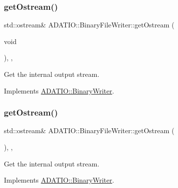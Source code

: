\subsubsection{\texorpdfstring{getOstream()}{getOstream()}\hspace{0.1cm}{\footnotesize\ttfamily [1/3]}}
{\footnotesize\ttfamily std\+::ostream\& A\+D\+A\+T\+I\+O\+::\+Binary\+File\+Writer\+::get\+Ostream (\begin{DoxyParamCaption}\item[{void}]{ }\end{DoxyParamCaption})\hspace{0.3cm}{\ttfamily [inline]}, {\ttfamily [protected]}, {\ttfamily [virtual]}}



Get the internal output stream. 



Implements \mbox{\hyperlink{classADATIO_1_1BinaryWriter_a4fe227341d17d012bb83a070c208dac0}{A\+D\+A\+T\+I\+O\+::\+Binary\+Writer}}.

\mbox{\label{classADATIO_1_1BinaryFileWriter_a2506200a774d4823088a0365e0452d9a}} 
\subsubsection{\texorpdfstring{getOstream()}{getOstream()}\hspace{0.1cm}{\footnotesize\ttfamily [2/3]}}
{\footnotesize\ttfamily std\+::ostream\& A\+D\+A\+T\+I\+O\+::\+Binary\+File\+Writer\+::get\+Ostream (\begin{DoxyParamCaption}{ }\end{DoxyParamCaption})\hspace{0.3cm}{\ttfamily [inline]}, {\ttfamily [protected]}, {\ttfamily [virtual]}}



Get the internal output stream. 



Implements \mbox{\hyperlink{classADATIO_1_1BinaryWriter_a4fe227341d17d012bb83a070c208dac0}{A\+D\+A\+T\+I\+O\+::\+Binary\+Writer}}.

\mbox{\label{classADATIO_1_1BinaryFileWriter_a2506200a774d4823088a0365e0452d9a}} 
